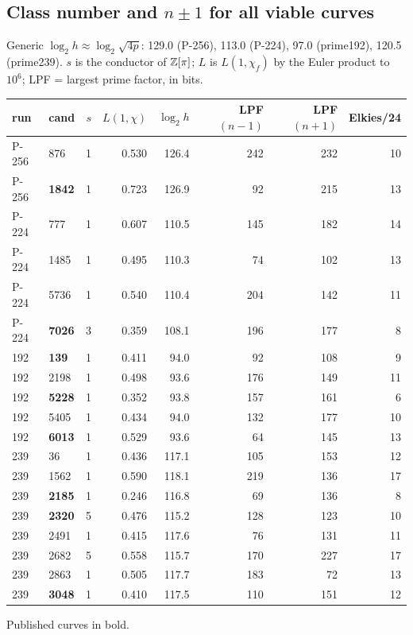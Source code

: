 \subsection{Class number and $n\pm1$ for all viable curves}
Generic $\log_2 h \approx \log_2\sqrt{4p}$: 129.0 (P-256), 113.0 (P-224), 97.0 (prime192), 120.5 (prime239). $s$ is the conductor of $\mathbb{Z}[\pi]$; $L$ is $L(1,\chi_f)$ by the Euler product to $10^6$; LPF = largest prime factor, in bits.

\begin{center}\small
\begin{tabular}{llrrrrrr}
\toprule
run & cand & $s$ & $L(1,\chi)$ & $\log_2 h$ & LPF$(n{-}1)$ & LPF$(n{+}1)$ & Elkies/24 \\
\midrule
P-256 & 876 & 1 & 0.530 & 126.4 & 242 & 232 & 10 \\
P-256 & \textbf{1842} & 1 & 0.723 & 126.9 & 92 & 215 & 13 \\
P-224 & 777 & 1 & 0.607 & 110.5 & 145 & 182 & 14 \\
P-224 & 1485 & 1 & 0.495 & 110.3 & 74 & 102 & 13 \\
P-224 & 5736 & 1 & 0.540 & 110.4 & 204 & 142 & 11 \\
P-224 & \textbf{7026} & 3 & 0.359 & 108.1 & 196 & 177 & 8 \\
192 & \textbf{139} & 1 & 0.411 & 94.0 & 92 & 108 & 9 \\
192 & 2198 & 1 & 0.498 & 93.6 & 176 & 149 & 11 \\
192 & \textbf{5228} & 1 & 0.352 & 93.8 & 157 & 161 & 6 \\
192 & 5405 & 1 & 0.434 & 94.0 & 132 & 177 & 10 \\
192 & \textbf{6013} & 1 & 0.529 & 93.6 & 64 & 145 & 13 \\
239 & 36 & 1 & 0.436 & 117.1 & 105 & 153 & 12 \\
239 & 1562 & 1 & 0.590 & 118.1 & 219 & 136 & 17 \\
239 & \textbf{2185} & 1 & 0.246 & 116.8 & 69 & 136 & 8 \\
239 & \textbf{2320} & 5 & 0.476 & 115.2 & 128 & 123 & 10 \\
239 & 2491 & 1 & 0.415 & 117.6 & 76 & 131 & 11 \\
239 & 2682 & 5 & 0.558 & 115.7 & 170 & 227 & 17 \\
239 & 2863 & 1 & 0.505 & 117.7 & 183 & 72 & 13 \\
239 & \textbf{3048} & 1 & 0.410 & 117.5 & 110 & 151 & 12 \\
\bottomrule
\end{tabular}
\end{center}
Published curves in bold.

